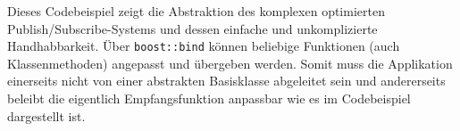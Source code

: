 

Dieses Codebeispiel zeigt die Abstraktion des komplexen optimierten Publish/Subscribe-Systems und dessen einfache und unkomplizierte Handhabbarkeit. Über \texttt{boost::bind} können beliebige Funktionen (auch Klassenmethoden) angepasst und übergeben werden. Somit muss die Applikation einerseits nicht von einer abstrakten Basisklasse abgeleitet sein und andererseits beleibt die eigentlich Empfangsfunktion anpassbar wie es im Codebeispiel dargestellt ist.
